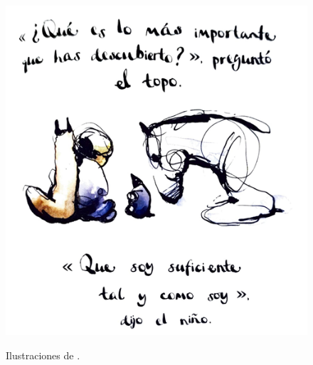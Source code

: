\documentclass[spanish]{textolivre}
\begin{document}
\begin{figure}[htbp]
\begin{minipage}[t]{0.32\textwidth}
\includegraphics[width=\linewidth]{Fig3.png}
 \label{fig3}
\end{minipage}
\caption{Ilustraciones de  \cite{mackesy_nino_2020}.}
\label{fig:01a03}
\end{figure}



\end{document}
